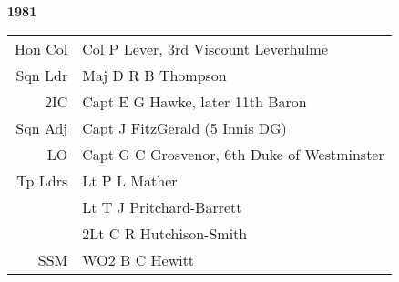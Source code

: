 \begin{center}
  \Huge
  \textbf{1981}
\end{center}

\begin{center}
  \small
  \begin{tabular}{rl}
    Hon Col & Col P Lever, 3rd Viscount Leverhulme \\
    Sqn Ldr & Maj D R B Thompson \\
    2IC & Capt E G Hawke, later 11th Baron \\
    Sqn Adj & Capt J FitzGerald (5 Innis DG) \\
    LO & Capt G C Grosvenor, 6th Duke of Westminster \\
    Tp Ldrs & Lt P L Mather \\
      & Lt T J Pritchard-Barrett \\
      & 2Lt C R Hutchison-Smith \\
    SSM & WO2 B C Hewitt \\
  \end{tabular}
\end{center}

